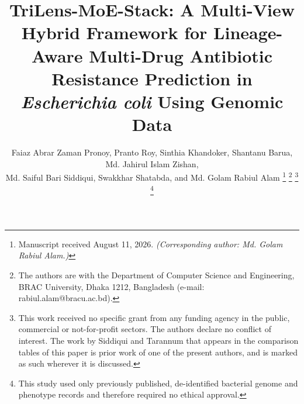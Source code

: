 \documentclass[journal]{IEEEtran}
\begin{document}
\title{TriLens-MoE-Stack: A Multi-View Hybrid Framework for
Lineage-Aware Multi-Drug Antibiotic Resistance Prediction
in \textit{Escherichia coli} Using Genomic Data}

\author{Faiaz Abrar Zaman Pronoy, Pranto Roy, Sinthia Khandoker, Shantanu Barua,
Md. Jahirul Islam Zishan,\\ Md. Saiful Bari Siddiqui, Swakkhar Shatabda,
and Md. Golam Rabiul Alam%
\thanks{Manuscript received August 11, 2026. \emph{(Corresponding author:
Md. Golam Rabiul Alam.)}}%
\thanks{The authors are with the Department of Computer Science and
Engineering, BRAC University, Dhaka 1212, Bangladesh
(e-mail: rabiul.alam@bracu.ac.bd).}%
\thanks{This work received no specific grant from any funding agency in the
public, commercial or not-for-profit sectors. The authors declare no conflict of
interest. The work by Siddiqui and Tarannum that appears in the comparison tables
of this paper is prior work of one of the present authors, and is marked as such
wherever it is discussed.}%
\thanks{This study used only previously published, de-identified bacterial
genome and phenotype records and therefore required no ethical approval.}}


\maketitle
\end{document}
